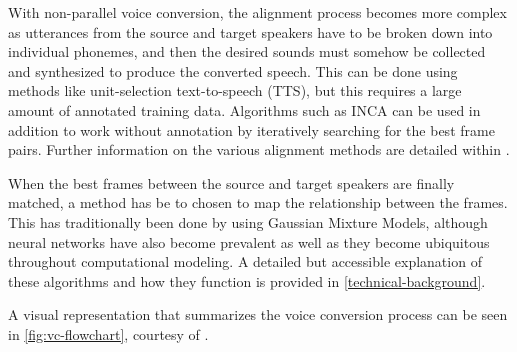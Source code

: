 \documentclass
[
    a4paper,
    twoside,
    12pt,
]
{report}
\begin{document}
With non-parallel voice conversion, the alignment process becomes more
complex as utterances from the source and target speakers have to be
broken down into individual phonemes, and then the desired sounds must
somehow be collected and synthesized to produce the converted speech.
This can be done using methods like unit-selection text-to-speech (TTS),
but this requires a large amount of annotated training data. Algorithms
such as INCA can be used in addition to work without annotation by
iteratively searching for the best frame pairs. Further information on
the various alignment methods are detailed within
\textcite{mohammadi2017}.

When the best frames between the source and target speakers are finally
matched, a method has be to chosen to map the relationship between the
frames. This has traditionally been done by using Gaussian Mixture
Models, although neural networks have also become prevalent as well as
they become ubiquitous throughout computational modeling. A detailed but
accessible explanation of these algorithms and how they function is
provided in \autoref{technical-background}.

A visual representation that summarizes the voice conversion process can
be seen in \autoref{fig:vc-flowchart}, courtesy of
\textcite{mohammadi2017}.
\end{document}
